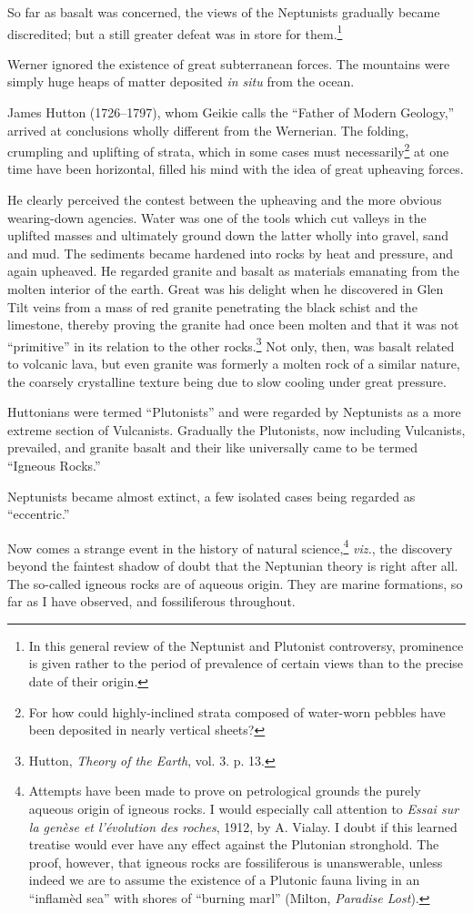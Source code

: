 \documentclass[a4paper, 12pt, oneside]{article}
\begin{document}
So far as basalt was concerned, the views of the Neptunists gradually became discredited; but a still greater defeat was in store for them.\footnote{In this general review of the Neptunist and Plutonist controversy, prominence is given rather to the period of prevalence of certain views than to the precise date of their origin.}

Werner ignored the existence of great subterranean forces. The mountains were simply huge heaps of matter deposited \emph{in situ} from the ocean.

James Hutton (1726--1797), whom Geikie calls the ``Father of Modern Geology,'' arrived at conclusions wholly different from the Wernerian. The folding, crumpling and uplifting of strata, which in some cases must necessarily\footnote{For how could highly-inclined strata composed of water-worn pebbles have been deposited in nearly vertical sheets?} at one time have been horizontal, filled his mind with the idea of great upheaving forces.

He clearly perceived the contest between the upheaving and the more obvious wearing-down agencies. Water was one of the tools which cut valleys in the uplifted masses and ultimately ground down the latter wholly into gravel, sand and mud. The sediments became hardened into rocks by heat and pressure, and again upheaved. He regarded granite and basalt as materials emanating from the molten interior of the earth. Great was his delight when he discovered in Glen Tilt veins from a mass of red granite penetrating the black schist and the limestone, thereby proving the granite had once been molten and that it was not ``primitive'' in its relation to the other rocks.\footnote{Hutton, \emph{Theory of the Earth}, vol. 3. p. 13.} Not only, then, was basalt related to volcanic lava, but even granite was formerly a molten rock of a similar nature, the coarsely crystalline texture being due to slow cooling under great pressure.

Huttonians were termed ``Plutonists'' and were regarded by Neptunists as a more extreme section of Vulcanists. Gradually the Plutonists, now including Vulcanists, prevailed, and granite basalt and their like universally came to be termed ``Igneous Rocks.''

Neptunists became almost extinct, a few isolated cases being regarded as ``eccentric.''

Now comes a strange event in the history of natural science,\footnote{Attempts have been made to prove on petrological grounds the purely aqueous origin of igneous rocks. I would especially call attention to \emph{Essai sur la genèse et l'évolution des roches}, 1912, by A. Vialay. I doubt if this learned treatise would ever have any effect against the Plutonian stronghold. The proof, however, that igneous rocks are fossiliferous is unanswerable, unless indeed we are to assume the existence of a Plutonic fauna living in an ``inflamèd sea'' with shores of ``burning marl'' (Milton, \emph{Paradise Lost}).} \emph{viz.}, the discovery beyond the faintest shadow of doubt that the Neptunian theory is right after all. The so-called igneous rocks are of aqueous origin. They are marine formations, so far as I have observed, and fossiliferous throughout.
\end{document}
